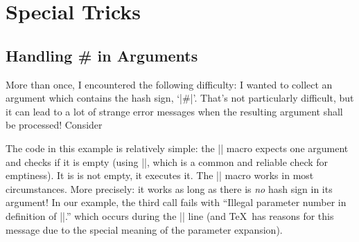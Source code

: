 




\section{Special Tricks}

\subsection{Handling \# in Arguments}
More than once, I encountered the following difficulty: I wanted to collect an argument which contains the hash sign, `|#|'. That's not particularly difficult, but it can lead to a lot of strange error messages when the resulting argument shall be processed! Consider 
The code in this example is relatively simple: the |\collectargument| macro expects one argument and checks if it is empty (using |\ifx|, which is a common and reliable check for emptiness). It is is not empty, it executes it. The |\collectargument| macro works in most circumstances. More precisely: it works as long as there is \emph{no} hash sign in its argument! In our example, the third call fails with ``Illegal parameter number in definition of |\collectedcontent|.'' which occurs during the |\def\collectedcontent{#1}| line (and \TeX\ has reasons for this message due to the special meaning of the parameter expansion).

